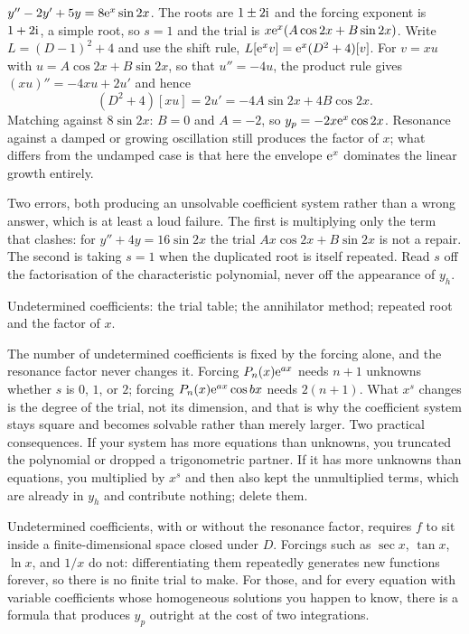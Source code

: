 \begin{worked}
$y''-2y'+5y=8\mathrm{e}^{x}\sin2x$. The roots are $1\pm2\mathrm{i}$ and the forcing exponent is $1+2\mathrm{i}$, a simple root, so $s=1$ and the trial is $x\mathrm{e}^{x}(A\cos2x+B\sin2x)$. Write $L=(D-1)^{2}+4$ and use the shift rule, $L[\mathrm{e}^{x}v]=\mathrm{e}^{x}(D^{2}+4)[v]$. For $v=xu$ with $u=A\cos2x+B\sin2x$, so that $u''=-4u$, the product rule gives $(xu)''=-4xu+2u'$ and hence
\[(D^{2}+4)[xu]=2u'=-4A\sin2x+4B\cos2x.\]
Matching against $8\sin2x$: $B=0$ and $A=-2$, so $y_p=-2x\mathrm{e}^{x}\cos2x$. Resonance against a damped or growing oscillation still produces the factor of $x$; what differs from the undamped case is that here the envelope $\mathrm{e}^{x}$ dominates the linear growth entirely.
\end{worked}

\begin{trap}
Two errors, both producing an unsolvable coefficient system rather than a wrong answer, which is at least a loud failure. The first is multiplying only the term that clashes: for $y''+4y=16\sin2x$ the trial $Ax\cos2x+B\sin2x$ is not a repair. The second is taking $s=1$ when the duplicated root is itself repeated. Read $s$ off the factorisation of the characteristic polynomial, never off the appearance of $y_h$.
\end{trap}

\begin{seealsob}Undetermined coefficients: the trial table; the annihilator method; repeated root and the factor of $x$.\end{seealsob}

\begin{keynote}
The number of undetermined coefficients is fixed by the forcing alone, and the resonance factor never changes it. Forcing $P_n(x)\mathrm{e}^{ax}$ needs $n+1$ unknowns whether $s$ is $0$, $1$, or $2$; forcing $P_n(x)\mathrm{e}^{ax}\cos bx$ needs $2(n+1)$. What $x^{s}$ changes is the degree of the trial, not its dimension, and that is why the coefficient system stays square and becomes solvable rather than merely larger. Two practical consequences. If your system has more equations than unknowns, you truncated the polynomial or dropped a trigonometric partner. If it has more unknowns than equations, you multiplied by $x^{s}$ and then also kept the unmultiplied terms, which are already in $y_h$ and contribute nothing; delete them.
\end{keynote}

Undetermined coefficients, with or without the resonance factor, requires $f$ to sit inside a finite-dimensional space closed under $D$. Forcings such as $\sec x$, $\tan x$, $\ln x$, and $1/x$ do not: differentiating them repeatedly generates new functions forever, so there is no finite trial to make. For those, and for every equation with variable coefficients whose homogeneous solutions you happen to know, there is a formula that produces $y_p$ outright at the cost of two integrations.


